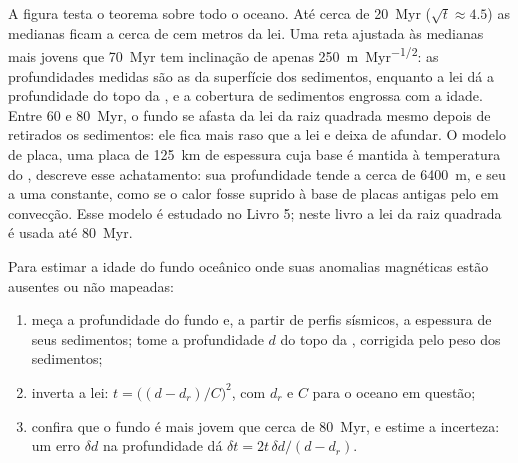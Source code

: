 \begin{omfigure}
\par{}
\label{fig:b1:rifts-ridges-margins:depth-age}
\end{omfigure}

A figura testa o teorema sobre todo o oceano. Até cerca de
\qty{20}{Myr} ($\sqrt t \approx 4.5$) as medianas ficam a cerca de cem metros da lei. Uma reta ajustada às medianas mais jovens que \qty{70}{Myr} tem inclinação de apenas \qty{250}{m.Myr^{-1/2}}: as profundidades medidas são as da superfície dos sedimentos, enquanto a lei dá a profundidade do topo da , e a cobertura de sedimentos engrossa com a idade. Entre 60 e
\qty{80}{Myr}, o fundo se afasta da lei da raiz quadrada mesmo depois de retirados os sedimentos: ele fica mais raso que a lei e deixa de afundar.
O modelo de placa, uma placa de \qty{125}{km} de espessura cuja base é mantida à temperatura do , descreve esse achatamento: sua profundidade tende a cerca de \qty{6400}{m}, e seu  a uma constante, como se o calor fosse suprido à base de placas antigas pelo  em convecção. Esse modelo é estudado no Livro 5; neste livro a lei da raiz quadrada é usada até \qty{80}{Myr}.

\begin{method}\label{met:b1:rifts-ridges-margins:age-from-depth}
Para estimar a idade do fundo oceânico onde suas anomalias magnéticas estão ausentes ou
não mapeadas:
\begin{enumerate}
  \item meça a profundidade do fundo e, a partir de perfis sísmicos, a
        espessura de seus sedimentos; tome a profundidade $d$ do topo da ,
        corrigida pelo peso dos sedimentos;
  \item inverta a lei: $t = \bigl((d - d_r)/C\bigr)^2$, com $d_r$ e $C$ para
        o oceano em questão;
  \item confira que o fundo é mais jovem que cerca de \qty{80}{Myr}, e estime
        a incerteza: um erro $\delta d$ na profundidade dá
        $\delta t = 2t\,\delta d/(d - d_r)$.
\end{enumerate}
\end{method}

